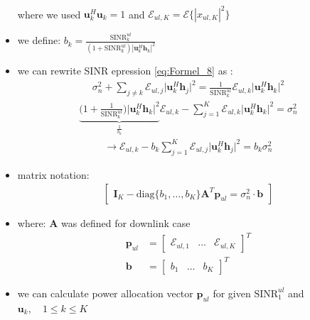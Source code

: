 \documentclass[a4paper, 10pt]{article}
\begin{document}
\begin{itemize}
\begin{align}
	\end{align}
	where we used $\mathbf{u}_k^H\mathbf{u}_k = 1 $ and $ \mathcal{E}_{ul,K} = \mathcal{E}\bigl\{|x_{ul,K}|^2\bigr\} $ 
	\item we define: $ b_k = \frac{\text{SINR}_k^{ul}}{(1 + \text{SINR}_k^{ul})|\mathbf{u}_k^H\mathbf{h}_k|^2} $
	\item we can rewrite SINR epression \eqref{eq:Formel_8} as : 
	\begin{align*}
		\sigma_n^2 + \sum\limits_{j\neq k}\mathcal{E}_{ul,j}\bigl|\mathbf{u}_k^H\mathbf{h}_j\bigr|^2 = \frac{1}{\text{SINR}_k^{ul}} \mathcal{E}_{ul,k}\bigl|\mathbf{u}_k^H\mathbf{h}_k\bigr|^2
	\end{align*}
	\begin{align*}
		\underbrace{\bigl(1 + \frac{1}{\text{SINR}_k^{ul}}\bigr)\bigl|\mathbf{u}_k^H\mathbf{h}_k\bigr|^2}_{\frac{1}{b_k}}\mathcal{E}_{ul,k} - \sum\limits_{j = 1}^{K}\mathcal{E}_{ul,k}\bigl|\mathbf{u}_k^H\mathbf{h}_k\bigr|^2 = \sigma_n^2
	\end{align*}
	\begin{align*}
		\rightarrow \mathcal{E}_{ul,k} - b_k\sum\limits_{j = 1}^{K}\mathcal{E}_{ul,j}\bigl|\mathbf{u}_k^H\mathbf{h}_j\bigr|^2 = b_k\sigma_n^2
	\end{align*}
	\item matrix notation:
	\begin{align*}
		\begin{bmatrix}
			\mathbf{I}_K - \text{diag}\bigl\{b_1,\ldots, b_K\bigr\}\mathbf{A}^T\mathbf{p}_{ul} = \sigma_n^2\cdot \mathbf{b}
		\end{bmatrix}
	\end{align*}
	\item where: $\mathbf{A} $ was defined for downlink case
	\begin{align*}
		\mathbf{p}_{ul} &= \begin{bmatrix} \mathcal{E}_{ul,1} & \ldots & \mathcal{E}_{ul,K}\end{bmatrix}^T \\
		\mathbf{b} &= \begin{bmatrix}b_1 & \ldots & b_K\end{bmatrix}^T				
	\end{align*}
	\item we can calculate power allocation vector $\mathbf{p}_{ul} $ for given $\text{SINR}_1^{ul} $ and $ \mathbf{u}_k,\quad 1\leq k \leq K $ 
\end{itemize} 
\end{document}
